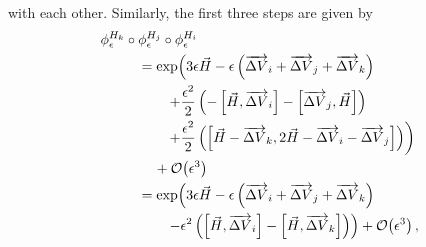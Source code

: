 \documentclass{article}
\begin{document}
with each other.  Similarly, the first three steps are given by
%
\begin{align*}
\phi^{H_{k}}_{\epsilon} \circ \phi^{H_{j}}_{\epsilon} \circ \phi^{H_{i}}_{\epsilon}
&
\\
& \hspace{-15mm} =
\exp \! \left( 
3 \epsilon \vec{H} 
- \epsilon \left( \overrightarrow{ \Delta V}_{i} +  \overrightarrow{ \Delta V}_{j} +  \overrightarrow{ \Delta V}_{k} \right)
\right.
\\
& \hspace{-8mm} \left.
+ \frac{\epsilon^{2}}{2} \left(
- \left[ \vec{H}, \overrightarrow{ \Delta V}_{i} \right]
- \left[ \overrightarrow{ \Delta V}_{j}, \vec{H} \right] \right) \right.
\\
& \hspace{-8mm} \left.
+ \frac{\epsilon^{2}}{2} \left(
\left[ \vec{H} - \overrightarrow{ \Delta V}_{k}, 2 \vec{H} - \overrightarrow{ \Delta V}_{i} - \overrightarrow{ \Delta V}_{j} \right]
\right)
\right)
\\
& \hspace{-11mm} + \mathcal{O} \! \left( \epsilon^{3} \right)
\\
& \hspace{-15mm} =
\exp \! \left( 
3 \epsilon \vec{H} 
- \epsilon \left( \overrightarrow{ \Delta V}_{i} + \overrightarrow{ \Delta V}_{j} + \overrightarrow{ \Delta V}_{k} \right)
\right.
\\
& \hspace{-8mm} \left.
- \epsilon^{2} \left( \left[ \vec{H}, \overrightarrow{ \Delta V}_{i} \right] 
- \left[ \vec{H}, \overrightarrow{ \Delta V}_{k} \right] \right)
\right) + \mathcal{O} \! \left( \epsilon^{3} \right),
\end{align*}
\end{document}
